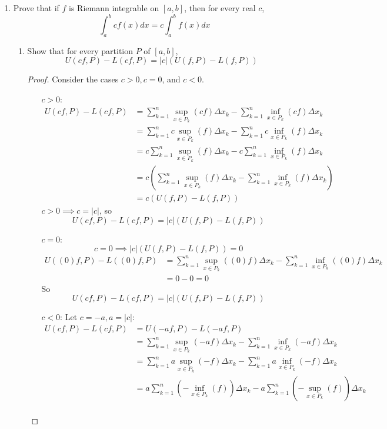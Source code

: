 \documentclass{article}
\newcommand{\<}{\langle}
\renewcommand{\>}{\rangle}
\begin{document}
\begin{enumerate}[(E1)]
\begin{enumerate}
    \end{enumerate}
    \item Prove that if $f$ is Riemann integrable on $[a,b]$, then for every real $c$,
    $$
    \int_{a}^{b}cf(x)dx = c\int_{a}^{b}f(x)dx
    $$
    \begin{enumerate}
    \item
    Show that for every partition $P$ of $[a,b]$, $$U(cf,P) - L(cf,P) = |c|(U(f,P) - L(f,P))$$
    \begin{proof}
    Consider the cases $c > 0, c = 0$, and $c < 0$.
    \begin{enumerate}
    \item[$c > 0$:]
    \begin{align*}
    U(cf,P) - L(cf,P) &= \sum_{k = 1}^n\sup_{x\in P_k}(cf) \Delta x_k - \sum_{k = 1}^n\inf_{x\in P_k}(cf) \Delta x_k\\
    &= \sum_{k = 1}^n c\sup_{x\in P_k}(f) \Delta x_k - \sum_{k = 1}^n c\inf_{x\in P_k}(f) \Delta x_k\\
    &= c\sum_{k = 1}^n\sup_{x\in P_k}(f) \Delta x_k - c\sum_{k = 1}^n\inf_{x\in P_k}(f) \Delta x_k\\
    &= c\left(\sum_{k = 1}^n\sup_{x\in P_k}(f) \Delta x_k - \sum_{k = 1}^n\inf_{x\in P_k}(f) \Delta x_k\right)\\
    &= c\left(U(f,P) - L(f,P)\right)
    \end{align*}
    $c > 0 \implies c = \lvert c\rvert$, so
    $$U(cf,P) - L(cf,P) = |c|\left(U(f,P) - L(f,P)\right)$$
    \item[$c=0$:]
    $$c = 0 \implies |c|\left(U(f, P) - L(f, P)\right) = 0$$
    \begin{align*}
    U\left((0)f, P\right) - L\left((0)f, P\right) &= \sum_{k = 1}^n\sup_{x\in P_k}((0)f) \Delta x_k - \sum_{k = 1}^n\inf_{x\in P_k}((0)f) \Delta x_k\\
    &= 0 - 0 = 0
    \end{align*}
    So
    $$U(cf,P) - L(cf,P) = |c|\left(U(f,P) - L(f,P)\right)$$
    \item[$c < 0$:]
    Let $c = -a, a = |c|$:
    \begin{align*}
    U(cf,P) - L(cf,P) &= U(-af,P) - L(-af,P)\\
    &= \sum_{k = 1}^n\sup_{x\in P_k}(-af) \Delta x_k - \sum_{k = 1}^n\inf_{x\in P_k}(-af) \Delta x_k\\
    &= \sum_{k = 1}^n a\sup_{x\in P_k}(-f) \Delta x_k - \sum_{k = 1}^n a\inf_{x\in P_k}(-f) \Delta x_k\\
    &= a\sum_{k = 1}^n\left(-\inf_{x\in P_k}(f)\right) \Delta x_k - a\sum_{k = 1}^n\left(-\sup_{x\in P_k}(f)\right) \Delta x_k\\

\end{align*}
\end{enumerate}
\end{proof}
\end{enumerate}
\end{enumerate}
\end{document}
